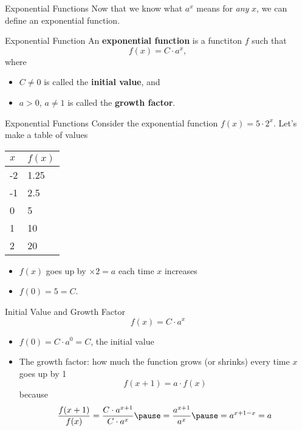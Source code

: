 \documentclass[]{beamer}
\begin{document}
	\begin{frame}{Exponential Functions}
		Now that we know what $a^x$ means for \textit{any} $x$, we can define an exponential function.
		\vfill
		\begin{block}{Exponential Function}
			An \textbf{exponential function} is a functiton $f$ such that
			\begin{equation*}
				f(x) = C \cdot a^x,
			\end{equation*}
			where
			\begin{itemize}
				\item $C \ne 0$ is called the \textbf{initial value}, and
				\item $a > 0$, $a \ne 1$ is called the \textbf{growth factor}.
			\end{itemize}
		\end{block}
	\end{frame}

	\begin{frame}{Exponential Functions}
		Consider the exponential function $f(x) = 5\cdot 2^x$. Let's make a table of values
		\vfill
		\begin{center}
		\begin{tabular}{@{}ll@{}}
			$x$ & $f(x)$ \\
			\midrule
			-2 & 1.25 \\
			-1 & 2.5 \\
			0 & 5 \\
			1 & 10 \\
			2 & 20
		\end{tabular}
		\end{center}
		\vfill\pause
		\begin{itemize}
			\item $f(x)$ goes up by $\times 2 = a$ each time $x$ increases
			\vfill\pause
			\item $f(0) = 5 = C$.
		\end{itemize}
	\end{frame}
	
	\begin{frame}{Initial Value and Growth Factor}
		\begin{equation*}
			f(x) = C\cdot a^x
		\end{equation*}
		\vfill
		\begin{itemize}
			\item $f(0) = C\cdot a^0 = C$, the initial value
			\vfill\pause
			\item The growth factor: how much the function grows (or shrinks) every time $x$ goes up by 1
			\begin{equation*}
				f(x+1) = a\cdot f(x)
			\end{equation*}
			\pause
			because
			\begin{equation*}
				\frac{f(x+1)}{f(x)} = \frac{C\cdot a^{x+1}}{C\cdot a^x} \pause = \frac{a^{x+1}}{a^x} \pause = a^{x+1-x} = a
			\end{equation*}
		\end{itemize}
	\end{frame}
\end{document}
